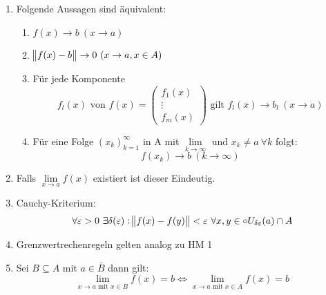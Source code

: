 \begin{enumerate}[label= (\alph*)]
    \item Folgende Aussagen sind äquivalent:
        \begin{enumerate}
            \item $f(x) \rightarrow  b\ (x \rightarrow a)$
            \item $\norm{f(x) - b} \rightarrow 0\ (x \rightarrow a, x \in A)$
            \item Für jede Komponente
                \begin{equation*}
                    f_l(x) \text{ von } f(x) =
                    \begin{pmatrix}
                        f_1(x)\\
                        \vdots \\
                        f_m(x)
                    \end{pmatrix}
                    \text{ gilt }
                    f_l(x) \rightarrow b_l\ (x \rightarrow a)
                \end{equation*}
            \item Für eine Folge ${(x_k)}_{k=1}^\infty$ in A mit
                $\lim\limits_{k \rightarrow \infty}$ und $x_k \neq a\ \forall k$ folgt:
                \begin{equation*}
                        f(x_k) \rightarrow b\ (k \rightarrow \infty)
                \end{equation*}
        \end{enumerate}
    \item Falls $\lim\limits_{x \rightarrow a} f(x)$ existiert ist dieser
        Eindeutig.
    \item Cauchy-Kriterium:
        \begin{equation*}
            \forall \varepsilon > 0\ \exists \delta(\varepsilon):
            \norm{f(x) -f(y)}<\varepsilon\ \forall x,y \in
            \circ{U}_{\delta{\varepsilon}}(a) \cap A
        \end{equation*}
    \item Grenzwertrechenregeln gelten analog zu HM 1
    \item Sei $B \subseteq A$ mit $a \in \bar{B}$ dann gilt:
        \begin{equation*}
            \lim_{x \rightarrow a \text{ mit } x \in B} f(x) = b \Leftrightarrow
            \lim_{x \rightarrow a \text{ mit } x \in A} f(x) = b
        \end{equation*}
\end{enumerate}

